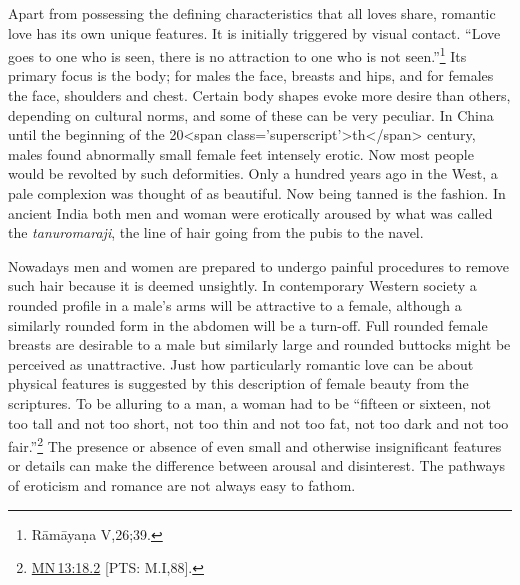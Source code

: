 \documentclass[10pt, openright]{book}
\begin{document}
Apart from possessing the defining characteristics that all loves share, romantic love has its own unique features. It is initially triggered by visual contact. “Love goes to one who is seen, there is no attraction to one who is not seen.”\footnote {Rāmāyaṇa V,26;39.} Its primary focus is the body; for males the face, breasts and hips, and for females the face, shoulders and chest. Certain body shapes evoke more desire than others, depending on cultural norms, and some of these can be very peculiar. In China until the beginning of the 20<span class='superscript'>th</span> century, males found abnormally small female feet intensely erotic. Now most people would be revolted by such deformities. Only a hundred years ago in the West, a pale complexion was thought of as beautiful. Now being tanned is the fashion. In ancient India both men and woman were erotically aroused by what was called the \textit{tanuromaraji}, the line of hair going from the pubis to the navel.


Nowadays men and women are prepared to undergo painful procedures to remove such hair because it is deemed unsightly. In contemporary Western society a rounded profile in a male’s arms will be attractive to a female, although a similarly rounded form in the abdomen will be a turn-off. Full rounded female breasts are desirable to a male but similarly large and rounded buttocks might be perceived as unattractive. Just how particularly romantic love can be about physical features is suggested by this description of female beauty from the scriptures. To be alluring to a man, a woman had to be “fifteen or sixteen, not too tall and not too short, not too thin and not too fat, not too dark and not too fair.”\footnote {\href{https://suttacentral.net/mn13/en/sujato\#18.2}{MN 13:18.2} [PTS: M.I,88].} The presence or absence of even small and otherwise insignificant features or details can make the difference between arousal and disinterest. The pathways of eroticism and romance are not always easy to fathom.
\end{document}
